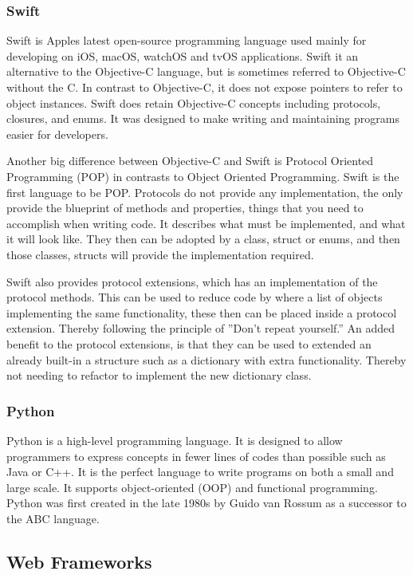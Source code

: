 \subsubsection{Swift}
Swift \cite{swift} is Apples latest open-source programming language used mainly for developing on iOS, macOS, watchOS and tvOS applications. Swift it an alternative to the Objective-C language, but is sometimes referred to Objective-C without the C. In contrast to Objective-C, it does not expose pointers to refer to object instances. Swift does retain Objective-C concepts including protocols, closures, and enums. It was designed to make writing and maintaining programs easier for developers.

Another big difference between Objective-C and Swift is Protocol Oriented Programming (POP) in contrasts to Object Oriented Programming. Swift is the first language to be POP. Protocols do not provide any implementation, the only provide the blueprint of methods and properties, things that you need to accomplish when writing code. It describes what must be implemented, and what it will look like. They then can be adopted by a class, struct or enums, and then those classes, structs will provide the implementation required.

Swift also provides protocol extensions, which has an implementation of the protocol methods. This can be used to reduce code by where a list of objects implementing the same functionality, these then can be placed inside a protocol extension. Thereby following the principle of ”Don’t repeat yourself.”  \cite{repeat} An added benefit to the protocol extensions, is that they can be used to extended an already built-in a structure such as a dictionary with extra functionality. Thereby not needing to refactor to implement the new dictionary class.

\subsubsection{Python}
Python \cite{python} is a high-level programming language. It is designed to allow programmers to express concepts in fewer lines of codes than possible such as Java or C++. It is the perfect language to write programs on both a small and large scale. It supports object-oriented (OOP) and functional programming. Python was first created in the late 1980s by Guido van Rossum as a successor to the ABC language.

\subsection{Web Frameworks}

